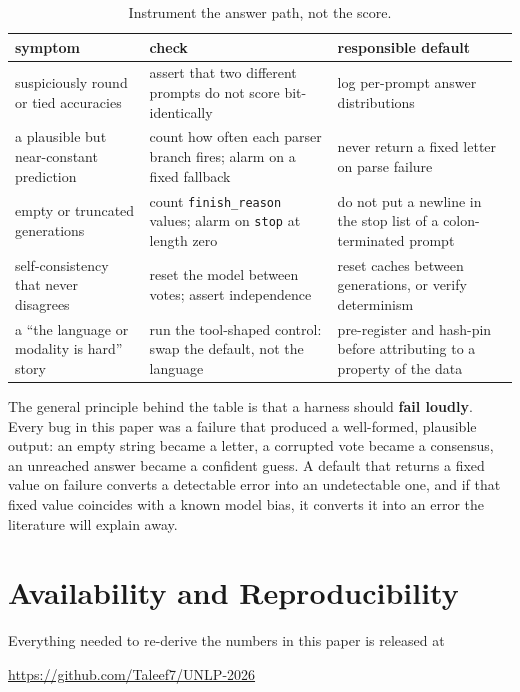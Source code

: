 \documentclass{article}
\begin{document}
\begin{table}
\centering
\begin{tabular}{p{}p{}p{}}
\toprule
\textbf{symptom} & \textbf{check} & \textbf{responsible default} \\
\midrule
suspiciously round or tied accuracies & assert that two different prompts do not score bit-identically & log per-prompt answer distributions \\
a plausible but near-constant prediction & count how often each parser branch fires; alarm on a fixed fallback & never return a fixed letter on parse failure \\
empty or truncated generations & count \verb|finish_reason| values; alarm on \texttt{stop} at length zero & do not put a newline in the stop list of a colon-terminated prompt \\
self-consistency that never disagrees & reset the model between votes; assert independence & reset caches between generations, or verify determinism \\
a ``the language or modality is hard'' story & run the tool-shaped control: swap the default, not the language & pre-register and hash-pin before attributing to a property of the data \\
\bottomrule
\end{tabular}
\caption{Instrument the answer path, not the score.}
\label{tab:checklist}
\end{table}

The general principle behind the table is that a harness should \textbf{fail loudly}. Every bug in this paper was a failure that produced a well-formed, plausible output: an empty string became a letter, a corrupted vote became a consensus, an unreached answer became a confident guess. A default that returns a fixed value on failure converts a detectable error into an undetectable one, and if that fixed value coincides with a known model bias, it converts it into an error the literature will explain away.

\section{Availability and Reproducibility}
\label{sec:availability}

Everything needed to re-derive the numbers in this paper is released at
\begin{center}
\url{https://github.com/Taleef7/UNLP-2026}
\end{center}
\end{document}
